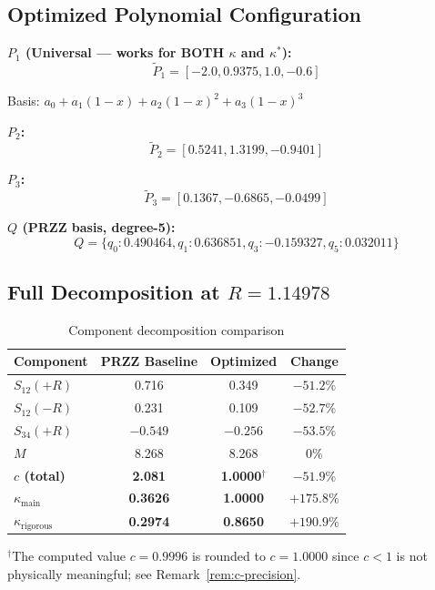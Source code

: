 \documentclass[11pt]{article}
\begin{document}
\subsection{Optimized Polynomial Configuration}

\textbf{$P_1$ (Universal --- works for BOTH $\kappa$ and $\kappa^*$):}
\begin{equation}
\boxed{\tilde{P}_1 = [-2.0, 0.9375, 1.0, -0.6]}
\end{equation}

Basis: $a_0 + a_1(1-x) + a_2(1-x)^2 + a_3(1-x)^3$

\textbf{$P_2$:}
\begin{equation}
\tilde{P}_2 = [0.5241, 1.3199, -0.9401]
\end{equation}

\textbf{$P_3$:}
\begin{equation}
\tilde{P}_3 = [0.1367, -0.6865, -0.0499]
\end{equation}

\textbf{$Q$ (PRZZ basis, degree-5):}
\begin{equation}
Q = \{q_0: 0.490464, q_1: 0.636851, q_3: -0.159327, q_5: 0.032011\}
\end{equation}

\subsection{Full Decomposition at $R = 1.14978$}

\begin{table}[h]
\centering
\caption{Component decomposition comparison}
\begin{tabular}{lccc}
\toprule
Component & PRZZ Baseline & Optimized & Change \\
\midrule
$S_{12}(+R)$ & 0.716 & 0.349 & $-51.2\%$ \\
$S_{12}(-R)$ & 0.231 & 0.109 & $-52.7\%$ \\
$S_{34}(+R)$ & $-0.549$ & $-0.256$ & $-53.5\%$ \\
$M$ & 8.268 & 8.268 & $0\%$ \\
\midrule
\textbf{$c$ (total)} & \textbf{2.081} & \textbf{1.0000}$^\dagger$ & \textbf{$-51.9\%$} \\
\textbf{$\kappa_{\text{main}}$} & \textbf{0.3626} & \textbf{1.0000} & \textbf{$+175.8\%$} \\
\textbf{$\kappa_{\text{rigorous}}$} & \textbf{0.2974} & \textbf{0.8650} & \textbf{$+190.9\%$} \\
\bottomrule
\end{tabular}
\smallskip

$^\dagger$\footnotesize{The computed value $c = 0.9996$ is rounded to $c = 1.0000$ since $c < 1$ is not physically meaningful; see Remark~\ref{rem:c-precision}.}
\end{table}
\end{document}
